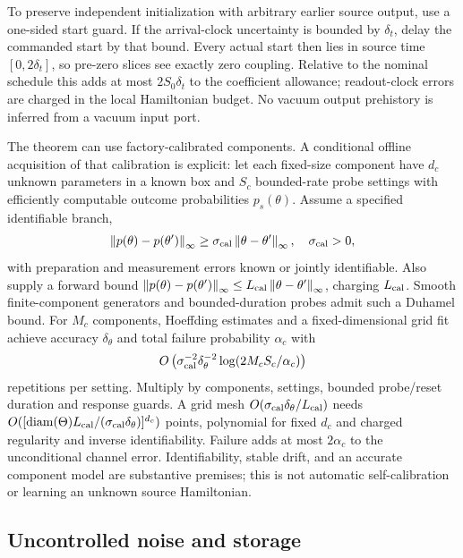 \documentclass[11pt,a4paper]{article}
\newcommand{\norm}[1]{\left\lVert #1\right\rVert}\newcommand{\ket}[1]{\lvert #1\rangle}\newcommand{\bra}[1]{\langle #1\rvert}
\begin{document}
To preserve independent initialization with arbitrary earlier source output, use a one-sided start guard. If the arrival-clock uncertainty is bounded by $\delta_t$, delay the commanded start by that bound. Every actual start then lies in source time $[0,2\delta_t]$, so pre-zero slices see exactly zero coupling. Relative to the nominal schedule this adds at most $2S_0\delta_t$ to the coefficient allowance; readout-clock errors are charged in the local Hamiltonian budget. No vacuum output prehistory is inferred from a vacuum input port.

The theorem can use factory-calibrated components. A conditional offline acquisition of that calibration is explicit: let each fixed-size component have $d_c$ unknown parameters in a known box and $S_c$ bounded-rate probe settings with efficiently computable outcome probabilities $p_s(\theta)$. Assume a specified identifiable branch,
\begin{equation}
 \norm{p(\theta)-p(\theta')}_\infty\ge
 \sigma_{\rm cal}\norm{\theta-\theta'}_\infty,\quad\sigma_{\rm cal}>0,
\end{equation}
with preparation and measurement errors known or jointly identifiable. Also supply a forward bound $\norm{p(\theta)-p(\theta')}_\infty\le L_{\rm cal}\norm{\theta-\theta'}_\infty$, charging $L_{\rm cal}$. Smooth finite-component generators and bounded-duration probes admit such a Duhamel bound. For $M_c$ components, Hoeffding estimates and a fixed-dimensional grid fit achieve accuracy $\delta_\theta$ and total failure probability $\alpha_c$ with
\begin{equation}
 O\left(\sigma_{\rm cal}^{-2}\delta_\theta^{-2}
 \log(2M_cS_c/\alpha_c)\right)
\end{equation}
repetitions per setting. Multiply by components, settings, bounded probe/reset duration and response guards. A grid mesh $O(\sigma_{\rm cal}\delta_\theta/L_{\rm cal})$ needs $O([\operatorname{diam}(\Theta)L_{\rm cal}/(\sigma_{\rm cal}\delta_\theta)]^{d_c})$ points, polynomial for fixed $d_c$ and charged regularity and inverse identifiability. Failure adds at most $2\alpha_c$ to the unconditional channel error. Identifiability, stable drift, and an accurate component model are substantive premises; this is not automatic self-calibration or learning an unknown source Hamiltonian.

\subsection{Uncontrolled noise and storage}
\end{document}
